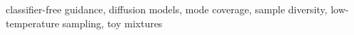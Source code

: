 classifier-free guidance, diffusion models, mode coverage, sample diversity, low-temperature sampling, toy mixtures
